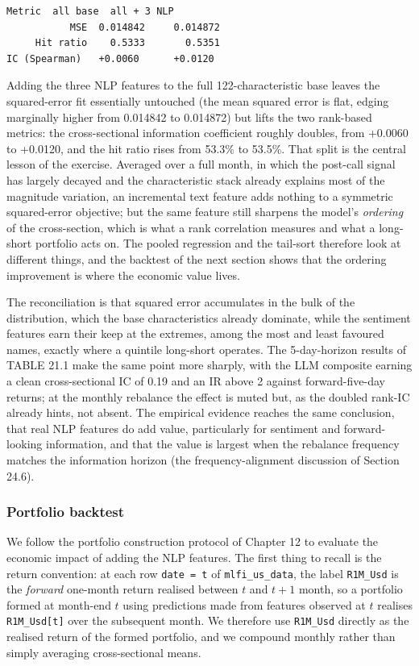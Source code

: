 \begin{verbatim}
Metric  all base  all + 3 NLP
           MSE  0.014842     0.014872
     Hit ratio    0.5333       0.5351
IC (Spearman)   +0.0060      +0.0120
\end{verbatim}

Adding the three NLP features to the full 122-characteristic base leaves the squared-error fit essentially untouched (the mean squared error is flat, edging marginally higher from 0.014842 to 0.014872) but lifts the two rank-based metrics: the cross-sectional information coefficient roughly doubles, from +0.0060 to +0.0120, and the hit ratio rises from 53.3\% to 53.5\%. That split is the central lesson of the exercise. Averaged over a full month, in which the post-call signal has largely decayed and the characteristic stack already explains most of the magnitude variation, an incremental text feature adds nothing to a symmetric squared-error objective; but the same feature still sharpens the model's \textit{ordering} of the cross-section, which is what a rank correlation measures and what a long-short portfolio acts on. The pooled regression and the tail-sort therefore look at different things, and the backtest of the next section shows that the ordering improvement is where the economic value lives.

The reconciliation is that squared error accumulates in the bulk of the distribution, which the base characteristics already dominate, while the sentiment features earn their keep at the extremes, among the most and least favoured names, exactly where a quintile long-short operates. The 5-day-horizon results of TABLE 21.1 make the same point more sharply, with the LLM composite earning a clean cross-sectional IC of 0.19 and an IR above 2 against forward-five-day returns; at the monthly rebalance the effect is muted but, as the doubled rank-IC already hints, not absent. The empirical evidence \citep{ke2019predicting, kim2024transcripts} reaches the same conclusion, that real NLP features do add value, particularly for sentiment and forward-looking information, and that the value is largest when the rebalance frequency matches the information horizon (the frequency-alignment discussion of Section 24.6).

\subsubsection{Portfolio backtest}

We follow the portfolio construction protocol of Chapter 12 to evaluate the economic impact of adding the NLP features. The first thing to recall is the return convention: at each row \texttt{date = t} of \texttt{mlfi\_us\_data}, the label \texttt{R1M\_Usd} is the \textit{forward} one-month return realised between $t$ and $t + 1$ month, so a portfolio formed at month-end $t$ using predictions made from features observed at $t$ realises \texttt{R1M\_Usd[t]} over the subsequent month. We therefore use \texttt{R1M\_Usd} directly as the realised return of the formed portfolio, and we compound monthly rather than simply averaging cross-sectional means.

